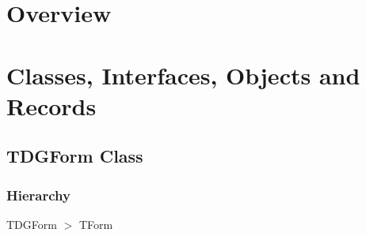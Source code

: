\documentclass{report}
\newif\ifpdf
\begin{document}
\section{Overview}
\begin{description}
\item[\texttt{\begin{ttfamily}TDGForm\end{ttfamily} Class}]
\end{description}
\section{Classes, Interfaces, Objects and Records}
\ifpdf
\subsection*{\large{\textbf{TDGForm Class}}\normalsize\hspace{1ex}\hrulefill}
\else
\subsection*{TDGForm Class}
\fi
\label{dgunit.TDGForm}
\subsubsection*{\large{\textbf{Hierarchy}}\normalsize\hspace{1ex}\hfill}
TDGForm {$>$} TForm
\end{document}
